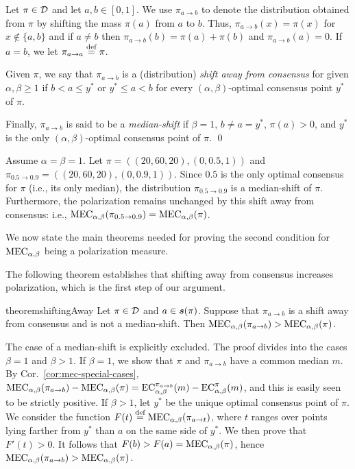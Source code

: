 \begin{definition}\label{def:movement}
Let \(\pi\in\mathcal{D}\) and let \(a,b\in[0,1]\). We use \(\pi_{a\to b}\) to denote the distribution obtained from \(\pi\) by shifting the mass \(\pi(a)\) from \(a\) to \(b\). Thus, \(\pi_{a\to b}(x)=\pi(x)\) for \(x\notin\{a,b\}\) and if $a \neq b$ then \(\pi_{a\to b}(b)=\pi(a)+\pi(b)\) and \(\pi_{a\to b}(a)=0\). If \(a=b\), we let \(\pi_{a\to a}\stackrel{\text{def}}{=} \pi\).

Given $\pi$, we say that \(\pi_{a\to b}\) is a (distribution) \emph{shift away from consensus} for given \(\alpha,\beta\ge 1\) if \(b<a\le y^*\) or \(y^*\le a<b\) for every $(\alpha,\beta)$-optimal consensus point \(y^*\) of \(\pi\).

Finally, \(\pi_{a\to b}\) is said to be a \emph{median-shift} if \(\beta=1\), \(b\neq a=y^*\), \(\pi(a)>0\), and \(y^*\) is the only $(\alpha,\beta)$-optimal consensus point of \(\pi\).
\qed 
\end{definition}

\begin{example}
Assume \(\alpha=\beta=1\). Let \(\pi=((20,60,20),(0,0.5,1))\) and \(\pi_{0.5\to 0.9}=((20,60,20),(0,0.9,1))\). Since \(0.5\) is the only optimal consensus for \(\pi\) (i.e., its only median), the distribution \(\pi_{0.5\to 0.9}\) is a median-shift of \(\pi\). Furthermore, the polarization remains unchanged by this shift away from consensus: i.e., \(\MEC(\pi_{0.5\to 0.9})=\MEC(\pi)\).
\end{example}

We now state the main theorems needed for proving the second condition for $\MEC$ being a polarization measure. 

The following theorem establishes that shifting away from consensus increases polarization, which is the first step of our argument.

\begin{restatable}{theorem}{shiftingAway}
\label{thm:mec-increases:body}
Let $\pi \in \mathcal{D}$ and $a\in\boldsymbol{s}(\pi)$. Suppose that  $\pi_{a\to b}$ is a shift away from consensus and is not a median-shift. Then $\MEC(\pi_{a\to b})> \MEC(\pi)$.
\end{restatable}

The case of a median-shift is explicitly excluded. The proof divides into the cases $\beta=1$ and $\beta>1$. If $\beta=1$, we show that $\pi$ and $\pi_{a\to b}$ have a common median $m$. By Cor.~\ref{cor:mec-special-cases}, $\MEC(\pi_{a\to b})-\MEC(\pi)=\EC[\alpha,\beta][\pi_{a\to b}](m)-\EC[\alpha,\beta][\pi](m)$, and this is easily seen to be strictly positive. If $\beta>1$, let $y^*$ be the unique optimal consensus point of $\pi$. We consider the function $F(t)\defsymbol \MEC(\pi_{a\to t})$, where $t$ ranges over points lying farther from $y^*$ than $a$ on the same side of $y^*$. We then prove that $F'(t)>0$. It follows that $F(b)>F(a)=\MEC(\pi)$, hence $\MEC(\pi_{a\to b})>\MEC(\pi)$.


